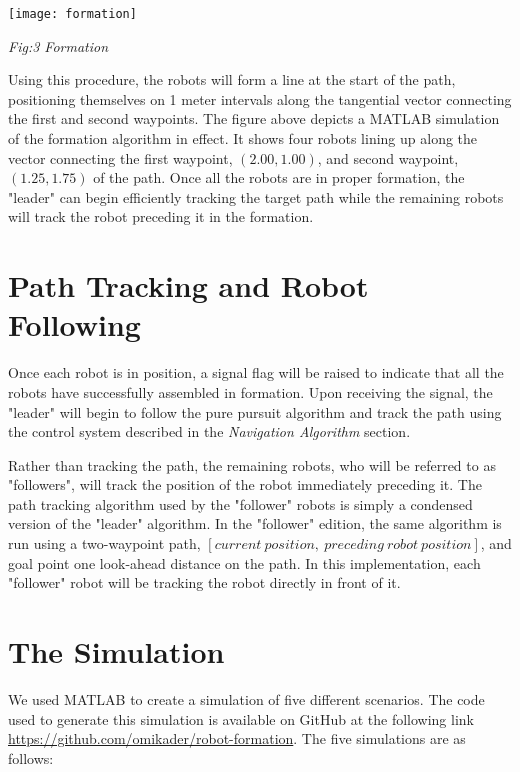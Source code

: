 \documentclass[journal]{IEEEtran}
\begin{document}
    \centerline{\texttt{[image: formation]}}
    \centerline{\textit{Fig:3 Formation}}
    
    Using this procedure, the robots will form a line at the start of the path, positioning themselves on 1 meter intervals along the tangential vector connecting the first and second waypoints. The figure above depicts a MATLAB simulation of the formation algorithm in effect. It shows four robots lining up along the vector connecting the first waypoint, $\left(2.00,1.00\right)$, and  second waypoint, $\left(1.25,1.75\right)$ of the path. Once all the robots are in proper formation, the "leader" can begin efficiently tracking the target path while the remaining robots will track the robot preceding it in the formation.

\section{Path Tracking and Robot Following}
    Once each robot is in position, a signal flag will be raised to indicate that all the robots have successfully assembled in formation. Upon receiving the signal, the "leader" will begin to follow the pure pursuit algorithm and track the path using the control system described in the \textit{Navigation Algorithm} section.
    
    Rather than tracking the path, the remaining robots, who will be referred to as "followers", will track the position of the robot immediately preceding it. The path tracking algorithm used by the "follower" robots is simply a condensed version of the "leader" algorithm. In the "follower" edition, the same algorithm is run using a two-waypoint path, $\left[current~position,~preceding~robot~position\right]$, and goal point one look-ahead distance on the path. In this implementation, each "follower" robot will be tracking the robot directly in front of it.

\section{The Simulation}
    We used MATLAB to create a simulation of five different scenarios. The code used to generate this simulation is available on GitHub at the following link \url{https://github.com/omikader/robot-formation}. The five simulations are as follows:
    
\end{document}
